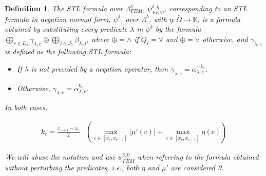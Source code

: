 \documentclass[letterpaper, 10 pt, conference]{ieeeconf/ieeeconf}
\newtheorem{definition}{Definition}
\newcommand*{\R}{\mathbb{R}}
\begin{document}
\begin{definition} 
\label{def:eta_approximation}
    The STL formula over $\Lambda^{\delta}_{FEM}$, $\psi^{\delta, \eta}_{FEM}$, corresponding to an STL
    formula in negation normal form, $\psi^\delta$, over $\Lambda^\delta$, with
    $\eta : \bar\Omega \to \R$, is a formula obtained by substituting every
    predicate $\lambda$ in $\psi^\delta$ by the formula $\bigoplus_{e \in
    E_\lambda} \gamma_{\lambda,e} \oplus \bigoplus_{j \in J_\lambda} \beta_{\lambda, j}$, 
    where $\oplus = \wedge$ if $Q_i = \forall$ and $\oplus = \vee$
    otherwise, and $\gamma_{\lambda,e}$ is defined as the following STL formula:

    \begin{itemize}
        \item If $\lambda$ is not preceded by a negation operator, then
            $\gamma_{\lambda, e} = \alpha_{\lambda, e}^{-k_e}$.
        \item Otherwise, $\gamma_{\lambda, e} = \alpha_{\lambda, e}^{k_e}$.
    \end{itemize}

    In both cases, 

    \begin{equation}
    \begin{aligned}
        k_e = \frac{x_{e+1} - x_e}{2} & \left (\max_{c \in [x_e, x_{e+1}]}
        |\mu'(c)| + \max_{c \in [x_e, x_{e+1}]} \eta(c) \right )
    \end{aligned}
    \end{equation}

    We will abuse the notation and use $\psi^{\delta, 0}_{FEM}$ when referring
    to the formula obtained without perturbing the predicates, i.e., both $\eta$
    and $\mu'$ are considered 0.
\end{definition}
\end{document}
